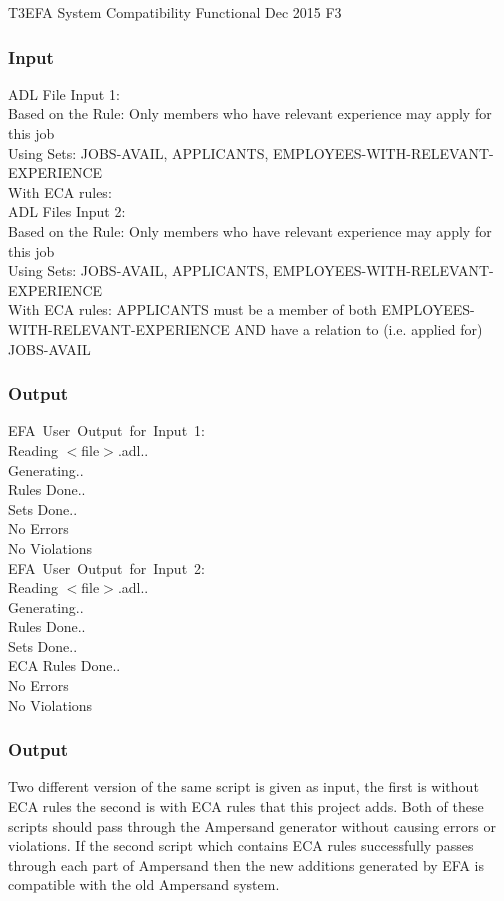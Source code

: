 \documentclass[12pt]{report}
\begin{document}
\systemTest
{T3}{EFA System Compatibility}
{Functional }
{Dec 2015}
{F3}
\vspace{-12pt}\subsubsection*{Input}
ADL File Input 1: \\
	Based on the Rule: Only members who have relevant experience may apply for 
	this 
	job \\
	Using Sets: JOBS-AVAIL, APPLICANTS, EMPLOYEES-WITH-RELEVANT-EXPERIENCE \\
	With ECA rules:\\
	ADL Files Input 2:\\
	Based on the Rule: Only members who have relevant experience may apply for 
	this 
	job \\
	Using Sets: JOBS-AVAIL, APPLICANTS, EMPLOYEES-WITH-RELEVANT-EXPERIENCE \\
	With ECA rules: APPLICANTS must be a member of both 
	EMPLOYEES-WITH-RELEVANT-EXPERIENCE AND have a relation to (i.e. applied 
	for) 
	JOBS-AVAIL \\
	
\vspace{-12pt}\subsubsection*{Output}
EFA\ User\ Output\ for\ Input\ 1: \\
	Reading $<$file$>$.adl.. \\
	Generating.. \\
	Rules Done.. \\
	Sets Done.. \\
	No Errors \\
	No Violations \\
	EFA\ User\ Output\ for\ Input\ 2: \\
	Reading $<$file$>$.adl..\\
	Generating.. \\
	Rules Done.. \\
	Sets Done.. \\
	ECA Rules Done.. \\
	No Errors \\
	No Violations \\
	
\vspace{-12pt}\subsubsection*{Output}
Two different version of the same script is given as input, the first is 
without ECA rules the second is with ECA rules that this project adds. Both of 
these scripts should pass through the Ampersand generator without causing 
errors or violations. If the second script which contains ECA rules 
successfully passes through each part of Ampersand then the new additions 
generated by EFA is compatible with the old Ampersand system.
\end{document}

